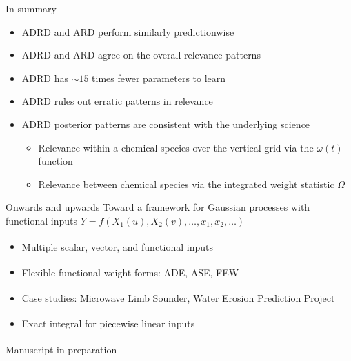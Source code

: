 \documentclass[final]{beamer}
\begin{document}
\begin{frame}[t]
{\begin{minipage}[t][76cm][t]{58cm}
\begin{minipage}[t]{1.0\linewidth}
\begin{minipage}[t]{.5\linewidth}
          \begin{block}{In summary}
            \begin{itemize}
            \item ADRD and ARD perform similarly predictionwise
            \item ADRD and ARD agree on the overall relevance patterns
            \item ADRD has $\sim15$ times fewer parameters to learn
            \item ADRD rules out erratic patterns in relevance
            \item ADRD posterior patterns are consistent with the underlying
              science
              \begin{itemize}
              \item Relevance within a chemical species over the vertical grid
                via the $\omega(t)$ function
              \item Relevance between chemical species via the integrated weight
                statistic $\Omega$
              \end{itemize}
            \end{itemize}
          \end{block}
        \end{minipage}
        \begin{minipage}[t]{.5\linewidth}
          \begin{block}{Onwards and upwards}
            Toward a framework for Gaussian processes with functional inputs
            $Y = f(X_1(u), X_2(v), \dots, x_1, x_2, \dots)$

            \begin{itemize}
            \item Multiple scalar\textsuperscript{\ddag}, vector, and functional inputs
            \item Flexible functional weight forms: ADE, ASE, FEW\textsuperscript{\ddag}
            \item Case studies: Microwave Limb Sounder,
              Water Erosion Prediction Project\textsuperscript{\ddag}
            \item Exact integral for piecewise linear inputs\textsuperscript{\ddag}
            \end{itemize}

            \textsuperscript{\ddag} Manuscript in preparation
          \end{block}


\end{minipage}
\end{minipage}
\end{minipage}}
\end{frame}
\end{document}
